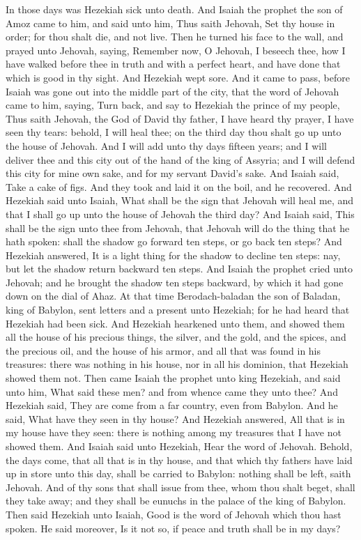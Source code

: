 In those days was Hezekiah sick unto death. And Isaiah the prophet the son of Amoz came to him, and said unto him, Thus saith Jehovah, Set thy house in order; for thou shalt die, and not live. Then he turned his face to the wall, and prayed unto Jehovah, saying, Remember now, O Jehovah, I beseech thee, how I have walked before thee in truth and with a perfect heart, and have done that which is good in thy sight. And Hezekiah wept sore. And it came to pass, before Isaiah was gone out into the middle part of the city, that the word of Jehovah came to him, saying, Turn back, and say to Hezekiah the prince of my people, Thus saith Jehovah, the God of David thy father, I have heard thy prayer, I have seen thy tears: behold, I will heal thee; on the third day thou shalt go up unto the house of Jehovah. And I will add unto thy days fifteen years; and I will deliver thee and this city out of the hand of the king of Assyria; and I will defend this city for mine own sake, and for my servant David’s sake. And Isaiah said, Take a cake of figs. And they took and laid it on the boil, and he recovered.  And Hezekiah said unto Isaiah, What shall be the sign that Jehovah will heal me, and that I shall go up unto the house of Jehovah the third day? And Isaiah said, This shall be the sign unto thee from Jehovah, that Jehovah will do the thing that he hath spoken: shall the shadow go forward ten steps, or go back ten steps? And Hezekiah answered, It is a light thing for the shadow to decline ten steps: nay, but let the shadow return backward ten steps. And Isaiah the prophet cried unto Jehovah; and he brought the shadow ten steps backward, by which it had gone down on the dial of Ahaz.  At that time Berodach-baladan the son of Baladan, king of Babylon, sent letters and a present unto Hezekiah; for he had heard that Hezekiah had been sick. And Hezekiah hearkened unto them, and showed them all the house of his precious things, the silver, and the gold, and the spices, and the precious oil, and the house of his armor, and all that was found in his treasures: there was nothing in his house, nor in all his dominion, that Hezekiah showed them not. Then came Isaiah the prophet unto king Hezekiah, and said unto him, What said these men? and from whence came they unto thee? And Hezekiah said, They are come from a far country, even from Babylon. And he said, What have they seen in thy house? And Hezekiah answered, All that is in my house have they seen: there is nothing among my treasures that I have not showed them.  And Isaiah said unto Hezekiah, Hear the word of Jehovah. Behold, the days come, that all that is in thy house, and that which thy fathers have laid up in store unto this day, shall be carried to Babylon: nothing shall be left, saith Jehovah. And of thy sons that shall issue from thee, whom thou shalt beget, shall they take away; and they shall be eunuchs in the palace of the king of Babylon. Then said Hezekiah unto Isaiah, Good is the word of Jehovah which thou hast spoken. He said moreover, Is it not so, if peace and truth shall be in my days? 